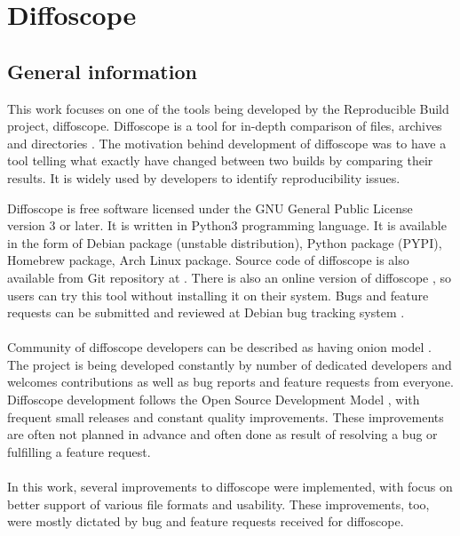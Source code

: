 \section{Diffoscope}

\subsection[General information]{General information}
This work focuses on one of the tools being developed by the
Reproducible Build project, diffoscope.
Diffoscope is a tool for in-depth comparison of files, archives and
directories \autocite{dfs}.
The motivation behind development of diffoscope was to have a tool
telling what exactly have changed between two builds by comparing
their results. It is widely used by developers to identify reproducibility issues.

Diffoscope is free software licensed under the GNU General Public
License version 3 or later. It is written in Python3 programming language.
It is available in the form of Debian package (unstable distribution),
Python package (PYPI), Homebrew package, Arch Linux package. Source code
of diffoscope is also available from Git repository at \autocite{dfs-git}.
There is also an online version of diffoscope \autocite{try-dfs}, so users
can try this tool without installing it on their system.
Bugs and feature requests can be submitted and reviewed at Debian
bug tracking system \autocite{dfs-bugs}.\\\\
Community of diffoscope developers can be described as having
onion model \autocite{aberdour2007achieving}.
The project is being developed constantly by number of dedicated
developers and welcomes contributions as well as bug reports
and feature requests from everyone.
Diffoscope development follows the Open Source Development Model
\autocite{osdm}, with frequent small releases and constant quality improvements.
These improvements are often not planned in advance and often
done as result of resolving a bug or fulfilling a feature request.\\\\
In this work, several improvements to diffoscope were implemented,
with focus on better support of various file formats and usability.
These improvements, too, were mostly dictated by bug and feature requests
received for diffoscope.


